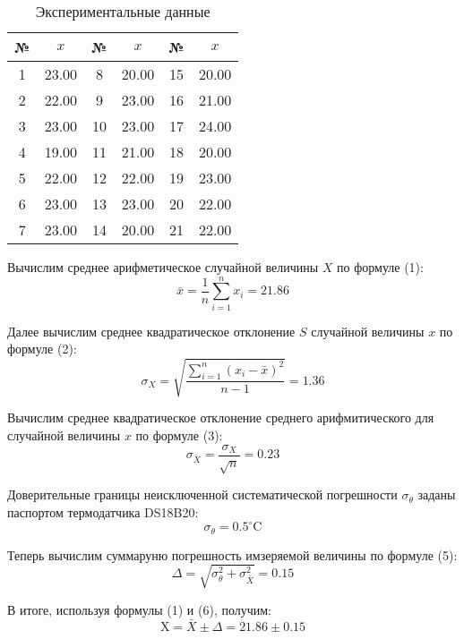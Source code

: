 \documentclass[utf8x, 12pt]{G7-32}
\begin{document}
 
\setcounter{table}{0} 
\renewcommand{\thetable}{\arabic{table}} 
\renewcommand{\theequation}{\arabic{equation}} 
\begin{table} 
\centering 
\caption{Экспериментальные данные} 
\begin{tabular}{|c|c||c|c||c|c|} 
\hline 
№ & $x$ & № & $x$ & № & $x$ \\  
\hline 
1 & 23.00 & 8 & 20.00 & 15 & 20.00 \\ 
\hline 
2 & 22.00 & 9 & 23.00 & 16 & 21.00 \\ 
\hline 
3 & 23.00 & 10 & 23.00 & 17 & 24.00 \\ 
\hline 
4 & 19.00 & 11 & 21.00 & 18 & 20.00 \\ 
\hline 
5 & 22.00 & 12 & 22.00 & 19 & 23.00 \\ 
\hline 
6 & 23.00 & 13 & 23.00 & 20 & 22.00 \\ 
\hline 
7 & 23.00 & 14 & 20.00 & 21 & 22.00 \\ 
\hline 
\end{tabular} 
\end{table} 
Вычислим среднее арифметическое случайной величины $X$ по формуле (1): 
\begin{equation} 
\bar{x}=\frac{1}{n} \sum_{i=1}^n x_i =21.86 
\end{equation} 

Далее вычислим среднее квадратическое отклонение $S$  случайной величины $x$ по формуле (2): 
\begin{equation} 
\sigma_X=\sqrt{\frac{\sum_{i=1}^n\left(x_i-\bar{x}\right)^2}{n-1}} = 1.36 
\end{equation} 

Вычислим среднее квадратическое отклонение среднего арифмитического для случайной величины $x$ по формуле (3): 
\begin{equation} 
\sigma_{\bar{X}}=\frac{\sigma_X}{\sqrt{n}} = 0.23 
\end{equation} 

Доверительные границы неисключенной систематической погрешности $\sigma_{\theta}$ заданы паспортом термодатчика DS18B20: 
\begin{equation} 
\sigma_\theta=0.5^{\circ} \mathrm{C} 
\end{equation} 

Теперь вычислим суммаруню погрешность имзеряемой величины по формуле (5): 
\begin{equation} 
\Delta=\sqrt{\sigma_\theta^2+\sigma_{\bar{X}}^2} = 0.15 
\end{equation} 

В итоге, используя формулы (1) и (6), получим: 
\begin{equation} 
\mathrm{X}=\bar{X} \pm \Delta = 21.86\pm0.15 
\end{equation} 
\end{document}
